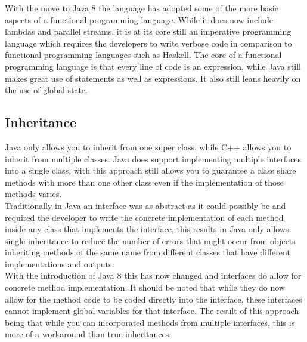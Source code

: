 \documentclass[10pt]{article}  %
\theoremstyle{definition}
\theoremstyle{remark}
\begin{document}
With the move to Java 8 the language has adopted some of the more basic aspects of a functional programming language. While it does now include lambdas and parallel streams, it is at its core still an imperative programming language which requires the developers to write verbose code in comparison to functional programming languages such as Haskell. The core of a functional programming language is that every line of code is an expression, while Java still makes great use of statements as well as expressions. It also still leans heavily on the use of global state. 

\subsection{Inheritance}\label{ss:back}

Java only allows you to inherit from one super class, while C++ allows you to inherit from multiple classes. Java does support implementing multiple interfaces into a single class, with this approach still allows you to guarantee a class share methods with more than one other class even if the implementation of those methods varies.\\

Traditionally in Java an interface was as abstract as it could possibly be and required the developer to write the concrete implementation of each method inside any class that implements the interface, this results in Java only allows single inheritance to reduce the number of errors that might occur from objects inheriting methods of the same name from different classes that have different implementations and outputs.\\

With the introduction of Java 8 this has now changed and interfaces do allow for concrete method implementation. It should be noted that while they do now allow for the method code to be coded directly into the interface, these interfaces cannot implement global variables for that interface. The result of this approach being that while you can incorporated methods from
multiple interfaces, this is more of a workaround than true inheritances. 
\end{document}
